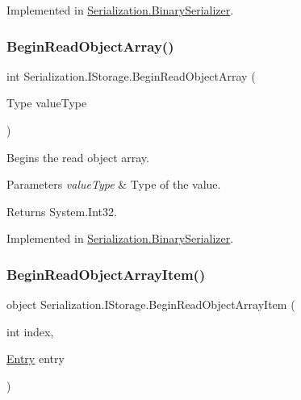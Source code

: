 Implemented in \hyperlink{class_serialization_1_1_binary_serializer_a44117e9f1e92e01af20f98cbd674f638}{Serialization.\+Binary\+Serializer}.

\mbox{\label{interface_serialization_1_1_i_storage_a4d7741da3862a1398e0566d362eb0827}} 
\subsubsection{\texorpdfstring{Begin\+Read\+Object\+Array()}{BeginReadObjectArray()}}
{\footnotesize\ttfamily int Serialization.\+I\+Storage.\+Begin\+Read\+Object\+Array (\begin{DoxyParamCaption}\item[{Type}]{value\+Type }\end{DoxyParamCaption})}



Begins the read object array. 


\begin{DoxyParams}{Parameters}
{\em value\+Type} & Type of the value.\\
\hline
\end{DoxyParams}
\begin{DoxyReturn}{Returns}
System.\+Int32.
\end{DoxyReturn}


Implemented in \hyperlink{class_serialization_1_1_binary_serializer_a0d547b6b511f0e0e547f3e2b231d2b68}{Serialization.\+Binary\+Serializer}.

\mbox{\label{interface_serialization_1_1_i_storage_a3d3197fc76431c156d291c5e46240018}} 
\subsubsection{\texorpdfstring{Begin\+Read\+Object\+Array\+Item()}{BeginReadObjectArrayItem()}}
{\footnotesize\ttfamily object Serialization.\+I\+Storage.\+Begin\+Read\+Object\+Array\+Item (\begin{DoxyParamCaption}\item[{int}]{index,  }\item[{\hyperlink{class_serialization_1_1_entry}{Entry}}]{entry }\end{DoxyParamCaption})}



